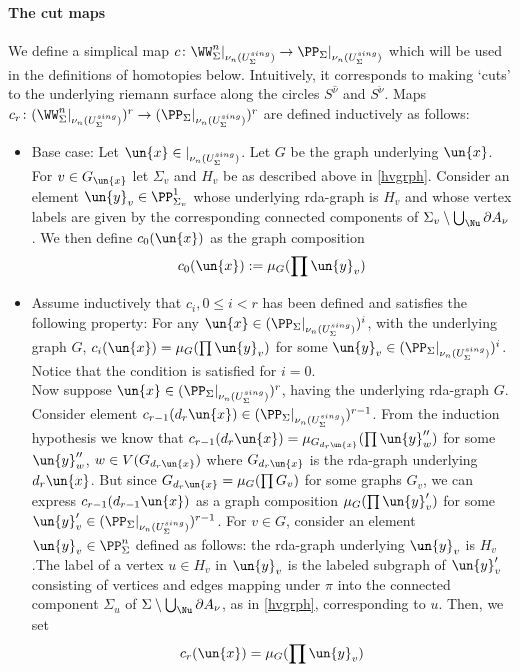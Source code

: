 \documentclass[a4paper,10pt]{amsart}
\begin{document}
	\paragraph{\textbf{The cut maps}}\label{cutmaps} We define a simplical map $c \colon \WW^{n}_{\Sigma}|_{\nu_n(U_{\Sigma}^{sing})} \to \PP_{\Sigma}|_{\nu_n(U_{\Sigma}^{sing})}$ which will be used in the definitions of homotopies below. Intuitively, it corresponds to making `cuts' to the underlying riemann surface along the circles $S^{\hat{\nu}}$ and $S^{\check{\nu}}$.
	Maps $c_r \colon (\WW^{n}_{\Sigma}|_{\nu_n(U_{\Sigma}^{sing})})^r \to (\PP_{\Sigma}|_{\nu_n(U_{\Sigma}^{sing})})^r$ are defined inductively as follows:
		\begin{itemize}
			\item Base case: Let $\un{x} \in |_{\nu_n(U_{\Sigma}^{sing})}$. Let $G$ be the graph underlying $\un{x}$. For $v \in G_{\un{x}}$ let $\Sigma_v$ and $H_v$ be as described above in \ref{hvgrph}. Consider an element $\un{y}_v \in \PP^1_{\Sigma_v}$ whose underlying rda-graph is $H_v$ and whose vertex labels are given by the corresponding connected components of $\Sigma_v \setminus \bigcup_{\Nu} \partial A_{\nu}$.  We then define $c_0(\un{x})$ as the graph composition 
			\begin{equation}\label{c0eq} c_0(\un{x}) := \mu_G( \prod \un{y}_v ) \end{equation}
			\item Assume inductively that $c_i, 0 \leq i <r$ has been defined and satisfies the following property: For any $\un{x} \in(\PP_{\Sigma}|_{\nu_n(U_{\Sigma}^{sing})})^i$, with the underlying graph $G$, $c_{i} (\un{x}) = \mu_{G}( \prod \un{y}_v)$ for some $\un{y}_v \in (\PP_{\Sigma}|_{\nu_n(U_{\Sigma}^{sing})})^i$. Notice that the condition is satisfied for $i=0$.\\
		Now suppose $\un{x} \in(\PP_{\Sigma}|_{\nu_n(U_{\Sigma}^{sing})})^r$, having the underlying rda-graph $G$. Consider element $c_{r-1}(d_r \un{x}) \in(\PP_{\Sigma}|_{\nu_n(U_{\Sigma}^{sing})})^{r-1}$. From the induction hypothesis we know that $c_{r-1}(d_r \un{x}) =  \mu_{G_{d_r \un{x}}}(\prod \un{y}^{\prime \prime}_{w})$ for some $\un{y}^{\prime \prime}_w$, $w \in V( G_{d_r\un{x}} )$ where $G_{d_r\un{x}}$ is the rda-graph underlying $d_r\un{x}$. But since  $G_{d_r \un{x}}  = \mu_G( \prod G_v)$ for some graphs $G_v$, we can express $c_{r-1}(d_{r-1} \un{x})$  as a graph composition $\mu_G( \prod \un{y}^{\prime}_v )$ for some $\un{y}^{\prime}_v \in (\PP_{\Sigma}|_{\nu_n(U_{\Sigma}^{sing})})^{r-1}$. For $v \in G$, consider an element $\un{y}_v \in \PP^n_{\Sigma}$ defined as follows: the rda-graph underlying $\un{y}_v$ is $H_v$.The label of a vertex $u \in  H_v$ in $\un{y}_v$ is the labeled subgraph of $\un{y}^{\prime}_v$ consisting of vertices and edges mapping under $\pi$ into the connected component $\Sigma_u$ of $\Sigma \setminus \bigcup_{\Nu}\partial A_{\nu}$,  as in \ref{hvgrph}, corresponding to $u$. Then, we set 
		\[c_r(\un{x}) = \mu_G( \prod \un{y}_v)\]
		\end{itemize}
\end{document}
